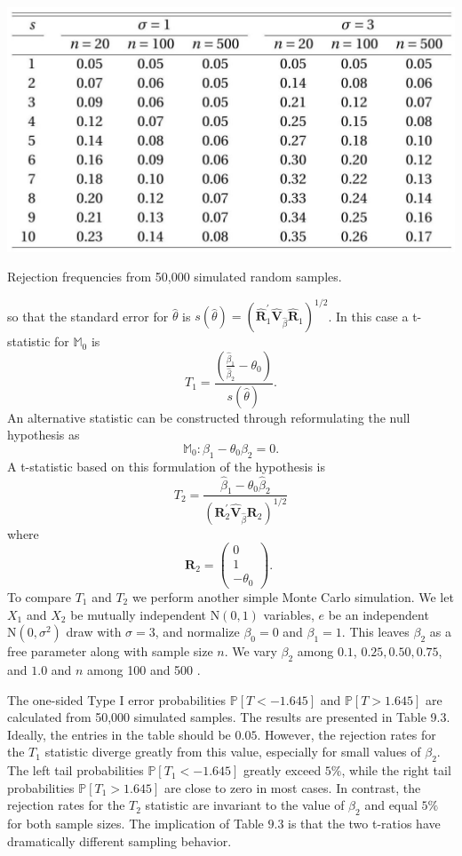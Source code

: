 \documentclass[10pt]{article}
\begin{document}
\includegraphics[max width=\textwidth]{2022_09_17_d22774979aa7978900adg-20}

Rejection frequencies from 50,000 simulated random samples.

so that the standard error for $\widehat{\theta}$ is $s(\widehat{\theta})=\left(\widehat{\boldsymbol{R}}_{1}^{\prime} \widehat{\boldsymbol{V}}_{\widehat{\beta}} \widehat{\boldsymbol{R}}_{1}\right)^{1 / 2}$. In this case a t-statistic for $\mathbb{M}_{0}$ is
$$
T_{1}=\frac{\left(\frac{\widehat{\beta}_{1}}{\widehat{\beta}_{2}}-\theta_{0}\right)}{s(\widehat{\theta})} .
$$
An alternative statistic can be constructed through reformulating the null hypothesis as
$$
\mathbb{M}_{0}: \beta_{1}-\theta_{0} \beta_{2}=0 .
$$
A t-statistic based on this formulation of the hypothesis is
$$
T_{2}=\frac{\widehat{\beta}_{1}-\theta_{0} \widehat{\beta}_{2}}{\left(\boldsymbol{R}_{2}^{\prime} \widehat{\boldsymbol{V}}_{\widehat{\beta}} \boldsymbol{R}_{2}\right)^{1 / 2}}
$$
where
$$
\boldsymbol{R}_{2}=\left(\begin{array}{c}
0 \\
1 \\
-\theta_{0}
\end{array}\right) \text {. }
$$
To compare $T_{1}$ and $T_{2}$ we perform another simple Monte Carlo simulation. We let $X_{1}$ and $X_{2}$ be mutually independent $\mathrm{N}(0,1)$ variables, $e$ be an independent $\mathrm{N}\left(0, \sigma^{2}\right)$ draw with $\sigma=3$, and normalize $\beta_{0}=0$ and $\beta_{1}=1$. This leaves $\beta_{2}$ as a free parameter along with sample size $n$. We vary $\beta_{2}$ among $0.1$, $0.25,0.50,0.75$, and $1.0$ and $n$ among 100 and 500 .

The one-sided Type I error probabilities $\mathbb{P}[T<-1.645]$ and $\mathbb{P}[T>1.645]$ are calculated from 50,000 simulated samples. The results are presented in Table 9.3. Ideally, the entries in the table should be $0.05$. However, the rejection rates for the $T_{1}$ statistic diverge greatly from this value, especially for small values of $\beta_{2}$. The left tail probabilities $\mathbb{P}\left[T_{1}<-1.645\right]$ greatly exceed $5 \%$, while the right tail probabilities $\mathbb{P}\left[T_{1}>1.645\right]$ are close to zero in most cases. In contrast, the rejection rates for the $T_{2}$ statistic are invariant to the value of $\beta_{2}$ and equal $5 \%$ for both sample sizes. The implication of Table $9.3$ is that the two t-ratios have dramatically different sampling behavior.
\end{document}
